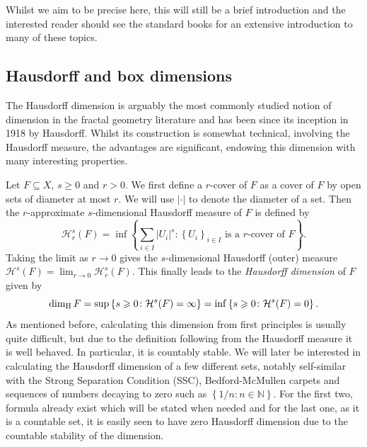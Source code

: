 Whilst we aim to be precise here, this will still be a brief introduction and the interested reader should see the standard books \cite{falconer, falconer2, mattila} for an extensive introduction to many of these topics. 



\subsection{Hausdorff and box dimensions}
\label{sec:intro-haus-box}

The Hausdorff dimension is arguably the most commonly studied notion of dimension in the fractal geometry literature and has been since its inception in 1918 by Hausdorff. Whilst its construction is somewhat technical, involving the Hausdorff measure, the advantages are significant, endowing this dimension with many interesting properties. 

Let $F\subseteq X$, $s\ge 0$ and $r > 0$. We first define a $r$-cover of $F$ as a cover of $F$ by open sets of diameter at most $r$. We will use $\lvert \cdot \rvert$ to denote the diameter of a set. Then the $r$-approximate $s$-dimensional Hausdorff measure of $F$ is defined by 
\[
\mathcal{H}^s_r (F) = \inf\left\{ \sum_{i\in I} \lvert U_i \rvert^s \colon \left\{U_i \right\}_{i\in I} \text{ is a $r$-cover of }F  \right\}.
\]
Taking the limit as $r \rightarrow 0 $ gives the $s$-dimensional Hausdorff (outer) measure $\mathcal{H}^s(F) = \lim_{r\rightarrow 0} \mathcal{H}^s_r(F)$. This finally leads to the \textit{Hausdorff dimension} of $F$ given by
\[
\dim_{\text{H}} F = \sup\left\{s \geqslant 0 \colon \mathcal{H}^s(F) = \infty\right\} = \inf\left\{s\geqslant 0 \colon \mathcal{H}^s(F) = 0\right\}.
\]
As mentioned before, calculating this dimension from first principles is usually quite difficult, but due to the definition following from the Hausdorff measure it is well behaved. In particular, it is countably stable. We will later be interested in calculating the Hausdorff dimension of a few different sets, notably self-similar with the Strong Separation Condition (SSC), Bedford-McMullen carpets and sequences of numbers decaying to zero such as $\left\{1/n \colon n\in \mathbb{N}\right\}$. For the first two, formula already exist which will be stated when needed and for the last one, as it is a countable set, it is easily seen to have zero Hausdorff dimension due to the countable stability of the dimension.

